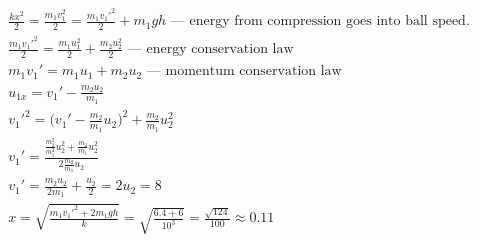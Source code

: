 \documentclass{article}
\begin{document}
\addtolength{\jot}{1pt}
\begin{fleqn}
  \begin{gather*}
    \frac{kx^2}{2} = \frac{m_1v_1^2}{2} = \frac{m_1v_1'^2}{2} + m_1gh
    \text{ — energy from compression goes into ball speed.} \\ 
    \frac{m_1v_1'^2}{2}=\frac{m_1u_1^2}{2}+\frac{m_2u_2^2}{2}
    \text{ — energy conservation law} \\
    m_1v_1' = m_1u_1 + m_2u_2
    \text{ — momentum conservation law} \\
    u_{1x} = v_1' - \frac{m_2u_2}{m_1} \\ 
    v_1'^2 = \Big(v_1' - \frac{m_2}{m_1}u_2\Big)^2+\frac{m_2}{m_1}u_2^2 \\
    v_1'=\frac{\frac{m_2^2}{m_1^2}u_2^2+\frac{m_2}{m_1}u_2^2}{2\frac{m_2}{m_1}u_2} \\
    v_1'=\frac{m_2u_2}{2m_1}+\frac{u_2}{2}=2u_2=8 \\
    x=
    \sqrt{\frac{m_1v_1'^2+2m_1gh}{k}}=
    \sqrt{\frac{6.4+6}{10^3}}=
    \frac{\sqrt{124}}{100} \approx \boxed{0.11} 
  \end{gather*}
\end{fleqn}
\end{document}
